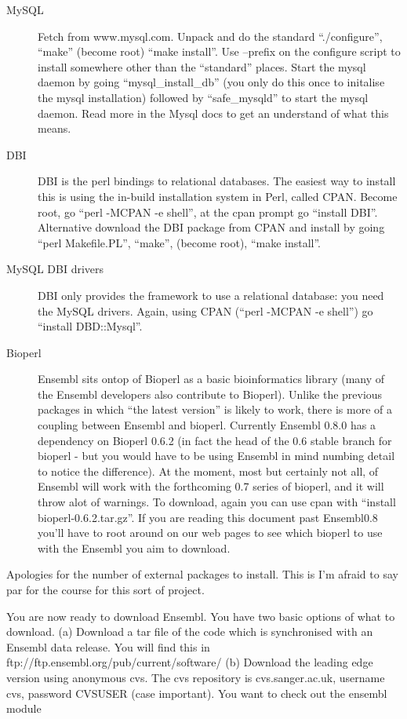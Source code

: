\documentclass[11pt,a4paper]{article}
\begin{document}
\begin{description}
\item[MySQL] Fetch from www.mysql.com. Unpack and do the standard ``./configure'',
``make'' (become root) ``make install''. Use --prefix on the configure script
to install somewhere other than the ``standard'' places. Start the mysql daemon by
going ``mysql\_install\_db'' (you only do this once to initalise the mysql installation) followed
by ``safe\_mysqld'' to start the mysql daemon. Read more in the Mysql docs to get an
understand of what this means.
\item[DBI] DBI is the perl bindings to relational databases. The easiest way to install
this is using the in-build installation system in Perl, called
CPAN. Become root, go ``perl -MCPAN -e shell'', at the cpan prompt go ``install DBI''.
Alternative download the DBI package from CPAN and install by going ``perl Makefile.PL'',
``make'', (become root), ``make install''.
\item[MySQL DBI drivers] DBI only provides the framework to use a relational database:
you need the MySQL drivers. Again, using CPAN (``perl -MCPAN -e shell'') go ``install DBD::Mysql''.
\item[Bioperl] Ensembl sits ontop of Bioperl as a basic bioinformatics library (many of the
Ensembl developers also contribute to Bioperl). Unlike the previous
packages in which ``the latest version'' is likely to work, there is
more of a coupling between Ensembl and bioperl. Currently Ensembl
0.8.0 has a dependency on Bioperl 0.6.2 (in fact the head of the 0.6
stable branch for bioperl - but you would have to be using Ensembl in
mind numbing detail to notice the difference).  At the moment, most
but certainly not all, of Ensembl will work with the forthcoming 0.7
series of bioperl, and it will throw alot of warnings. To download, again you can
use cpan with ``install bioperl-0.6.2.tar.gz''. If you are reading this document past Ensembl0.8
you'll have to root around on our web pages to see which bioperl to use with the Ensembl you aim
to download.
\end{description}

Apologies for the number of external packages to install. This is I'm afraid to say 
par for the course for this sort of project.

You are now ready to download Ensembl. You have two basic options of what to download.
(a) Download a tar file of the code which is synchronised with an Ensembl data release.
You will find this in ftp://ftp.ensembl.org/pub/current/software/ (b) Download the leading edge
version using anonymous cvs. The cvs repository is cvs.sanger.ac.uk, username cvs, password
CVSUSER (case important). You want to check out the ensembl module 
\end{document}
